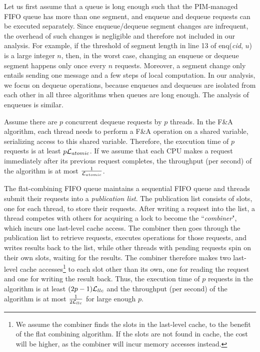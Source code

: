 Let us first assume that a queue is long enough such that the PIM-managed FIFO queue 
has more than one segment, and enqueue and dequeue requests can be executed separately. 
Since enqueue/dequeue segment changes are infrequent, 
the overhead of such changes is negligible and therefore not included in our analysis.
For example, if the threshold of segment length in line 13 of enq(\textit{cid}, $u$) is a large integer $n$, 
then, in the worst case, changing an enqueue or dequeue segment happens only once every $n$ requests.
Moreover, a segment change only entails sending one message and a few steps of local computation.
In our analysis, we focus on dequeue operations, because 
 enqueues and dequeues are isolated from each other in all three algorithms when queues are long enough.
 The analysis of enqueues is similar. 

Assume there are $p$ concurrent dequeue requests by $p$ threads. 
In the F\&A algorithm, each thread needs to perform a F\&A operation on a shared variable, 
serializing access to this shared variable. 
Therefore, 
the execution time of $p$ requests is at least $p\mathcal{L}_{atomic}$. 
If we assume that each CPU makes a request immediately after its previous request completes, 
the throughput (per second) of the algorithm is at most ${1 \over \mathcal{L}_{atomic}}$. 

The flat-combining FIFO queue maintains a sequential FIFO queue and 
threads submit their requests into a \emph{publication list}. 
The publication list consists of slots, one for each thread, to store their requests.
After writing a request into the list, a thread competes with others for acquiring a lock 
to become the ``\emph{combiner}", which incurs one last-level cache access. 
The combiner then goes through the publication list to retrieve requests, executes operations for those requests, 
and writes results back to the list, while other threads with pending requests spin on their own slots, 
waiting for the results. 
The combiner therefore makes two last-level cache accesses\footnote{We assume the combiner finds the slots 
in the last-level cache, to the benefit of the flat combining algorithm. If the slots are not found in cache, 
the cost will be higher, as the combiner will incur memory accesses instead.} to each slot other than its own, 
one for reading the request and one for writing the result back. 
Thus, the execution time of $p$ requests in the algorithm is at least $(2p-1)\mathcal{L}_{llc}$ and 
the throughput (per second) of the algorithm is at most ${1 \over 2\mathcal{L}_{llc}}$ for large enough $p$.

